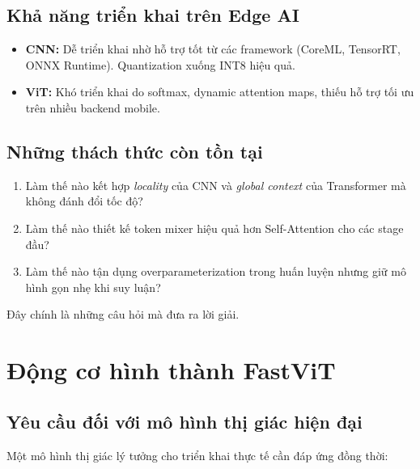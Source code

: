 \subsection{Khả năng triển khai trên Edge AI}

\begin{itemize}
    \item \textbf{CNN:} Dễ triển khai nhờ hỗ trợ tốt từ các framework (CoreML, TensorRT, ONNX Runtime). Quantization xuống INT8 hiệu quả.
    
    \item \textbf{ViT:} Khó triển khai do softmax, dynamic attention maps, thiếu hỗ trợ tối ưu trên nhiều backend mobile.
\end{itemize}

\subsection{Những thách thức còn tồn tại}

\begin{enumerate}
    \item Làm thế nào kết hợp \textit{locality} của CNN và \textit{global context} của Transformer mà không đánh đổi tốc độ?
    \item Làm thế nào thiết kế token mixer hiệu quả hơn Self-Attention cho các stage đầu?
    \item Làm thế nào tận dụng overparameterization trong huấn luyện nhưng giữ mô hình gọn nhẹ khi suy luận?
\end{enumerate}

Đây chính là những câu hỏi mà \fastvit{} đưa ra lời giải.

\section{Động cơ hình thành FastViT}
\label{sec:fastvit_motivation}

\subsection{Yêu cầu đối với mô hình thị giác hiện đại}

Một mô hình thị giác lý tưởng cho triển khai thực tế cần đáp ứng đồng thời:

